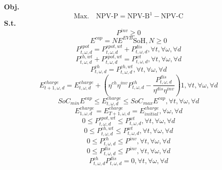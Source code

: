 \documentclass[final,5p,times,twocolumn,authoryear]{elsarticle}
\begin{document}
\noindent
\textbf{Obj.}
\begin{equation} \label{eq:outerobj}
\text{Max.} \quad \text{NPV-P} =  \text{NPV-B}^1 -\text{NPV-C} 
\end{equation}
\noindent
\textbf{S.t.}
\begin{equation} \label{eq:inverter}
P^{inv} \geq 0   
\end{equation}
\begin{equation} \label{eq:capacity}
E^{cap}  = N E^{EVB}   \text{SoH}, N \geq 0
\end{equation}
\begin{equation} \label{eq:spot}
P_{t,\omega,d}^{spot} = P_{t,\omega,d}^{spot,wt} +P_{t,\omega,d}^{dis}, \forall t,\forall \omega,\forall d
\end{equation}
\begin{equation} \label{eq:windfarmequilibrium1}
P_{t,\omega,d}^{ch,wt} + P_{t,\omega,d}^{spot,wt} = P_{t,\omega,d}^{wt},\forall t,\forall \omega,\forall d
\end{equation}
\begin{equation} \label{eq:charge}
P_{t,\omega,d}^{ch} = P_{t,\omega,d}^{ch,wt},\forall t,\forall \omega,\forall d
\end{equation}
\begin{equation} \label{eq:SoCequi}
E^{charge}_{t+1,\omega,d} = E^{charge}_{t,\omega,d}+(\eta^{ch} \eta^{inv} P_{t,\omega,d}^{ch}-\frac{P_{t,\omega,d}^{dis}}{\eta^{dis} \eta^{inv}})1,\forall t,\forall \omega,\forall d
\end{equation}
\begin{equation} \label{eq:SoClimit}
SoC_{min}E^{cap}\leq E^{charge}_{t,\omega,d} \leq SoC_{max}E^{cap},\forall t,\forall \omega,\forall d
\end{equation}
\begin{equation} \label{eq:SoCinitial}
E^{charge}_{1,\omega,d} = E^{charge}_{T + 1,\omega,d} = E^{charge}_{initial},\forall \omega,\forall d
\end{equation}
\begin{equation} \label{eq:spotlimit}
0 \leq P_{t,\omega,d}^{spot,wt} \leq P_{t,\omega,d}^{wt},\forall t,\forall \omega,\forall d 
\end{equation}
\begin{equation} \label{eq:windcharge}
0 \leq P_{t,\omega,d}^{ch,wt} \leq P_{t,\omega,d}^{wt} ,\forall t,\forall \omega,\forall d 
\end{equation}
\begin{equation} \label{eq:inv+}
0 \leq P_{t,\omega,d}^{ch} \leq P^{inv} ,\forall t,\forall \omega,\forall d 
\end{equation}
\begin{equation} \label{eq:inv-}
0 \leq P_{t,\omega,d}^{dis} \leq P^{inv},\forall t,\forall \omega,\forall d  
\end{equation}
\begin{equation} \label{eq:combinational}
P_{t,\omega,d}^{ch} P_{t,\omega,d}^{dis}  = 0, \forall t,\forall \omega,\forall d  
\end{equation}
\end{document}
